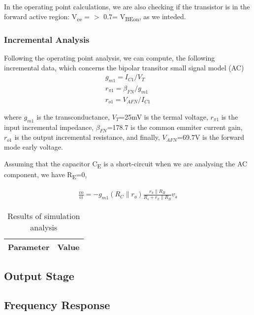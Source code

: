 In the operating point calculations, we are also checking if the transistor is in the forward active region:  V\textsubscript{ce} =  $>$ 0.7= V\textsubscript{BEon}, as we inteded.
\subsubsection{Incremental Analysis}
Following the operating point analysis, we can compute, the following incremental data, which concerns the bipolar transitor small signal model (AC)
\begin{align*} 
g_{m1}= I_{C1}/V_{T}\\
r_{\pi 1}=\beta_{FN}/g_{m1}\\
r_{o 1}=V_{AFN}/I_{C1}
\end{align*}

where $g_{m1}$ is the transconductance, $V_{T}$=25mV is the termal voltage, $r_{\pi 1}$ is the input incremental impedance, $\beta_{FN}$=178.7 is the common emmiter current gain, $r_{o 1}$ is the output incremental resistance, and finally, $V_{AFN}$=69.7V is the forward mode early voltage.


Assuming that the capacitor C\textsubscript{E} is a short-circuit when we are analysing the AC component, we have R\textsubscript{E}=0,

\begin{align*} 
\frac{vo}{vi}=-g_{m1} (R_C\parallel r_o) \frac{r_\pi \parallel R_B} {R_s+r_\pi\parallel R_B} v_s
\end{align*}

\begin{table}[!htb]
\centering
  \begin{tabular}{|c|c|}
    \hline    
    {\bf Parameter} & {\bf Value} \\ \hline
    
 \end{tabular}
 \caption{Results of simulation analysis}\label{tab:gainstage}
\end{table}

\subsection{Output Stage}

\subsection{Frequency Response}




